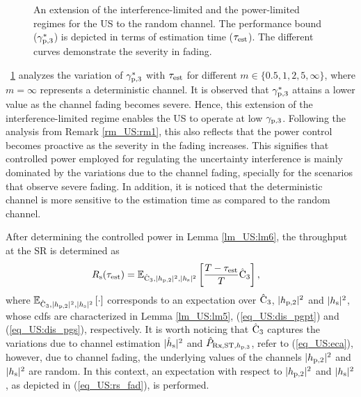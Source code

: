 \begin{figure}[!ht]
\caption{An extension of the interference-limited and the power-limited regimes for the US to the random channel. The performance bound (${\gamma}_{\text{p,3}}^*$) is depicted in terms of estimation time ($\tau_{\text{est}}$). The different curves demonstrate the severity in fading.} %
\label{fig_US:or_fad}
\end{figure}
\begin{remark} \label{rm_US:rm2}
\normalfont
\figurename~\ref{fig_US:or_fad} analyzes the variation of ${\gamma}_{\text{p,3}}^*$ with $\tau_{\text{est}}$ for different $m \in \{0.5, 1, 2, 5, \infty\}$, where $m = \infty$ represents a deterministic channel. It is observed that ${\gamma}_{\text{p,3}}^*$ attains a lower value as the channel fading becomes severe. Hence, this extension of the interference-limited regime enables the US to operate at low ${\gamma}_{\text{p,3}}$. Following the analysis from Remark \ref{rm_US:rm1}, this also reflects that the power control becomes proactive as the severity in the fading increases. This signifies that controlled power employed for regulating the uncertainty interference is mainly dominated by the variations due to the channel fading, specially for the scenarios that observe severe fading. In addition, it is noticed that the deterministic channel is more sensitive to the estimation time as compared to the random channel.  
\end{remark}
After determining the controlled power in Lemma \ref{lm_US:lm6}, the throughput at the SR is determined as
\begin{align}
R_{\text{s}}(\tau_{\text{est}}) &= {\mathbb E}_{\hat{\text{{C}}}_{\text{3}}, |h_{\text{p,2}}|^2, |h_{\text{s}}|^2}\left[ \frac{T - \tau_{\text{est}}}{T} \hat{\text{{C}}}_{\text{3}}  \right], \label{eq_US:rs_fad} 
\end{align} 
where ${\mathbb E}_{\hat{\text{{C}}}_{\text{3}}, |h_{\text{p,2}}|^2, |h_{\text{s}}|^2}\left[ \cdot \right]$ corresponds to an expectation over $\hat{\text{{C}}}_{\text{3}}$, $|h_{\text{p,2}}|^2$ and $|h_{\text{s}}|^2$, whose cdfs are characterized in Lemma \ref{lm_US:lm5}, (\ref{eq_US:dis_pgpt}) and (\ref{eq_US:dis_pgs}), respectively. It is worth noticing that $\hat{\text{{C}}}_{\text{3}}$ captures the variations due to channel estimation $|\hat{h}_{\text{s}}|^2$ and $\hat{P}_{\text{Rx,ST,$h_{\text{p,3}}$}}$, refer to (\ref{eq_US:eca}), however, due to channel fading, the underlying values of the channels $|h_{\text{p,2}}|^2$ and $|h_{\text{s}}|^2$ are random. In this context, an expectation with respect to $|h_{\text{p,2}}|^2$ and $|h_{\text{s}}|^2$, as depicted in (\ref{eq_US:rs_fad}), is performed.

